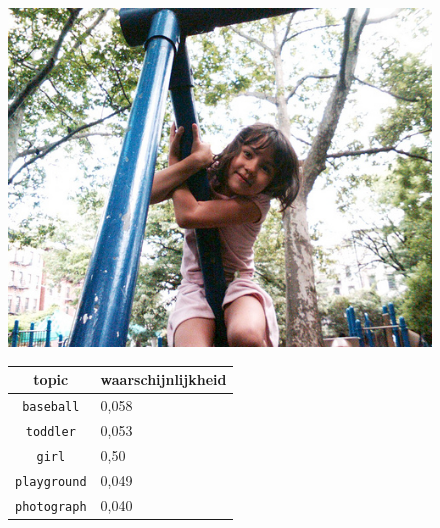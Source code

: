 \begin{figure}[!htb]
    \centering
    \begin{minipage}[t]{.5\linewidth}
    \centering
    \vspace{0pt}
    \includegraphics[width=\textwidth]{Images/LDA/3643021980.jpg}
    \end{minipage}\hfill
    \begin{minipage}[t]{.5\textwidth}
    \centering
    \vspace{0pt}
    \begin{tabular}{cl}
            topic                           & waarschijnlijkheid\\
            \hline
            \texttt{baseball}             & 0,058 \\
            \texttt{toddler}                   & 0,053 \\
            \texttt{girl}                 & 0,50 \\
            \texttt{playground}           & 0,049 \\
            \texttt{photograph}        & 0,040\\
            \hline
        \end{tabular}
    \end{minipage}
\end{figure}

